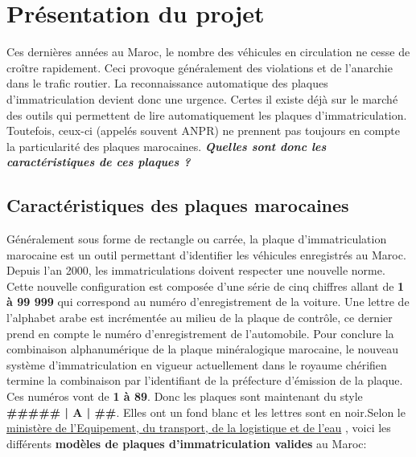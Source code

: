 \section{Présentation du projet}
Ces dernières années au Maroc, le nombre des véhicules en circulation ne cesse de croître rapidement. Ceci provoque généralement des violations et de l'anarchie dans le trafic routier. La reconnaissance automatique des plaques d’immatriculation devient donc une urgence. Certes il existe déjà sur le marché des outils qui permettent de lire automatiquement les plaques d’immatriculation. Toutefois, ceux-ci (appelés souvent ANPR) ne prennent pas toujours en compte la particularité des plaques marocaines. \textbf{\textit{Quelles sont donc les caractéristiques de ces plaques ?}}

    \subsection{Caractéristiques des plaques marocaines}
    Généralement sous forme de rectangle ou carrée, la plaque d’immatriculation marocaine est un outil permettant d’identifier les véhicules enregistrés au Maroc. Depuis l’an 2000, les immatriculations doivent respecter une nouvelle norme. Cette nouvelle configuration est composée d’une série de cinq chiffres allant de \textbf{1 à 99 999} qui correspond au numéro d’enregistrement de la voiture. Une lettre de l’alphabet arabe est incrémentée au milieu de la plaque de contrôle, ce dernier prend en compte le numéro d’enregistrement de l’automobile. Pour conclure la combinaison alphanumérique de la plaque minéralogique marocaine, le nouveau système d’immatriculation en vigueur actuellement dans le royaume chérifien termine la combinaison par l’identifiant de la préfecture d’émission de la plaque. Ces numéros vont de \textbf{1 à 89}. Donc les plaques sont maintenant du style \textbf{\#\#\#\#\# | A | \#\#}. Elles ont un fond blanc et les lettres sont en noir.Selon le \href{http://www.equipement.gov.ma/Transport-routier/Carte-grise/Pages/Differents-modeles-de-plaques-d-immatriculation-.aspx}{ministère de l'Equipement, du transport, de la logistique et de l'eau} \cite{mineq}, voici les différents \textbf{modèles de plaques d'immatriculation valides} au Maroc:
